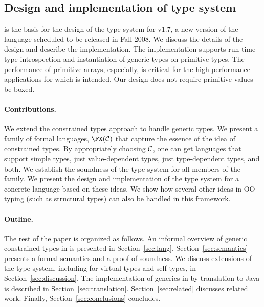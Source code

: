 \subsection{Design and implementation of \Xten{} type system}
\FXGD{} is the basis for the design of the type system for \Xten{} v1.7, a new
version of the language scheduled to be released in Fall 2008.  We
discuss the details of the design and describe the implementation.
The implementation supports run-time type introspection and
instantiation of generic types on primitive types.  The performance of
primitive arrays, especially, is critical for the high-performance
applications for which \Xten{} is intended.
Our design does not require primitive values be boxed.

\paragraph{Contributions.}
We extend the constrained types approach to handle generic types.  We
present a family of formal languages, $\FX(\cal C)$ that capture the
essence of the idea of constrained types. By appropriately choosing
$\cal C$, one can get languages that support simple types, just
value-dependent types, just type-dependent types, and both. We
establish the soundness of the type system for all members of the
family. We present the design and implementation of the type system
for a concrete language \Xten{} based on these ideas. We show how
several other ideas in OO typing (such as structural types) can also
be handled in this framework.

\paragraph{Outline.}

The rest of the paper is organized as follows.
%
An informal overview of generic constrained types in \Xten{}
is presented in
Section~\ref{sec:lang}.  
%
Section~\ref{sec:semantics} presents a formal semantics and a
proof of soundness.
%
We discuss extensions of the type system, including for
virtual types and self types, in
Section~\ref{sec:discussion}.
%
The implementation of generics in \Xten{} by translation to Java is described in 
Section~\ref{sec:translation}.
%
Section~\ref{sec:related} discusses related work.
%
Finally, Section~\ref{sec:conclusions} concludes.


